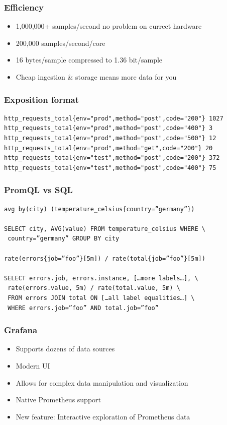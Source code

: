 \documentclass[aspectratio=169]{beamer}
\begin{document}
\begin{frame}
	\frametitle{Efficiency}
	\begin{itemize}
		\item 1,000,000+ samples/second no problem on currect hardware
		\item 200,000 samples/second/core
		\item 16 bytes/sample compressed to 1.36 bit/sample
		\item Cheap ingestion \& storage means more data for you
	\end{itemize}
\end{frame}

\begin{frame}[fragile]
	\frametitle{Exposition format}
	\fontsize{10pt}{12}\selectfont
	\begin{verbatim}
http_requests_total{env="prod",method="post",code="200"} 1027
http_requests_total{env="prod",method="post",code="400"} 3
http_requests_total{env="prod",method="post",code="500"} 12
http_requests_total{env="prod",method="get",code="200"} 20
http_requests_total{env="test",method="post",code="200"} 372
http_requests_total{env="test",method="post",code="400"} 75
	\end{verbatim}
\end{frame}

\begin{frame}[fragile]
	\frametitle{PromQL vs SQL}
	\fontsize{10pt}{12}\selectfont
	\begin{verbatim}
avg by(city) (temperature_celsius{country=”germany”})

SELECT city, AVG(value) FROM temperature_celsius WHERE \
 country=”germany” GROUP BY city

rate(errors{job=”foo”}[5m]) / rate(total{job=”foo”}[5m])

SELECT errors.job, errors.instance, […more labels…], \
 rate(errors.value, 5m) / rate(total.value, 5m) \
 FROM errors JOIN total ON […all label equalities…] \
 WHERE errors.job=”foo” AND total.job=”foo”
	\end{verbatim}
\end{frame}

\begin{frame}
	\frametitle{Grafana}
	\begin{itemize}
		\item Supports dozens of data sources
		\item Modern UI
		\item Allows for complex data manipulation and visualization
		\item Native Prometheus support
		\item New feature: Interactive exploration of Prometheus data
	\end{itemize}
\end{frame}
\end{document}
